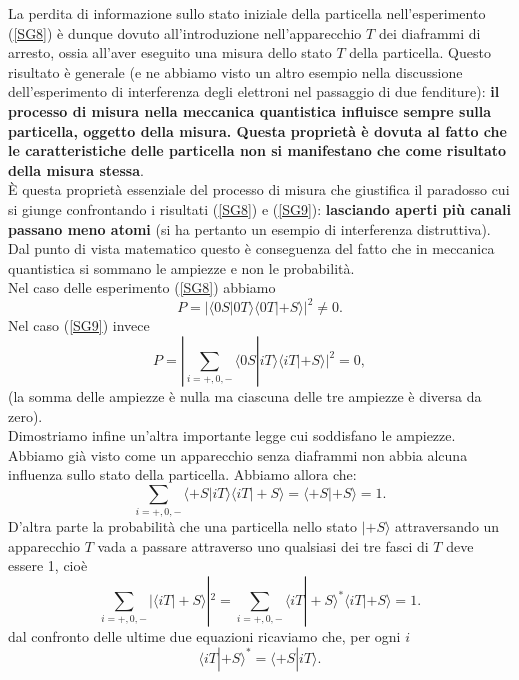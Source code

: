 \documentclass[a4paper,12pt,oneside]{book}
\begin{document}
La perdita di informazione sullo stato iniziale della particella nell'esperimento (\ref{SG8}) è dunque dovuto all'introduzione nell'apparecchio $T$ dei diaframmi di arresto, ossia all'aver eseguito una misura dello stato $T$ della particella. Questo risultato è generale (e ne abbiamo visto un altro esempio nella discussione dell'esperimento di interferenza degli elettroni nel passaggio di due fenditure): \textbf{il processo di misura nella meccanica quantistica influisce sempre sulla particella, oggetto della misura. Questa proprietà è dovuta al fatto che le caratteristiche delle particella non si manifestano che come risultato della misura stessa}.\\
È questa proprietà essenziale del processo di misura che giustifica il paradosso cui si giunge confrontando i risultati (\ref{SG8}) e (\ref{SG9}): \textbf{lasciando aperti più canali passano meno atomi} (si ha pertanto un esempio di interferenza distruttiva). Dal punto di vista matematico questo è conseguenza del fatto che in meccanica quantistica si sommano le ampiezze e non le probabilità.\\
Nel caso delle esperimento (\ref{SG8}) abbiamo
	\begin{equation}
		P= | \langle 0S | 0T \rangle \langle 0T | +S \rangle  |^2 \neq 0 .
	\end{equation}
Nel caso (\ref{SG9}) invece
	\begin{equation}
		P= |\sum \limits_{i=+,0,-}\langle 0S | iT \rangle \langle iT | +S \rangle |^2 =0 ,
	\end{equation}
(la somma delle ampiezze è nulla ma ciascuna delle tre ampiezze è diversa da zero).\\

Dimostriamo infine un'altra importante legge cui soddisfano le ampiezze. Abbiamo già visto come un apparecchio senza diaframmi non abbia alcuna influenza sullo stato della particella. Abbiamo allora che:
	\begin{equation}
	\sum \limits_{i=+,0,-}\langle +S | iT \rangle \langle iT | +S \rangle = \langle +S | +S \rangle =1 .
	\end{equation}
D'altra parte la probabilità che una particella nello stato $| +S \rangle$ attraversando un apparecchio $T$ vada a passare attraverso uno qualsiasi dei tre fasci di $T$ deve essere 1, cioè
	\begin{equation}
		\sum \limits_{i=+,0,-}|\langle iT | +S \rangle|^2= \sum \limits_{i=+,0,-} \langle iT | +S \rangle ^* \langle iT | +S \rangle= 1 .
	\end{equation}
dal confronto delle ultime due equazioni ricaviamo che, per ogni $i$
	\begin{equation}
 		\boxed{
 			\langle iT | +S \rangle ^* = \langle +S | iT \rangle .
 			}
	\label{cap3_3}
	\end{equation}
\end{document}
